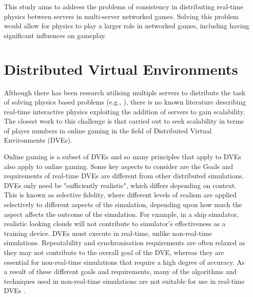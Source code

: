 This study aims to address the problems of consistency in distributing real-time physics between servers in multi-server networked games. Solving this problem would allow for physics to play a larger role in networked games, including having significant influences on gameplay.

\section{Distributed Virtual Environments} \label{distrubted_virtual_env}

Although there has been research utilising multiple servers to distribute the task of solving physics based problems (e.g., \cite{mashayekhi2018automatically}), there is no known literature describing real-time interactive physics exploiting the addition of servers to gain scalability. The closest work to this challenge is that carried out to seek scalability in terms of player numbers in online gaming in the field of Distributed Virtual Environments (DVEs). 

Online gaming is a subset of DVEs and so many principles that apply to DVEs also apply to online gaming. Some key aspects to consider are the Goals and requirements of real-time DVEs are different from other distributed simulations. DVEs only need be "sufficiently realistic", which differs depending on context. This is known as selective fidelity, where different levels of realism are applied selectively to different aspects of the simulation, depending upon how much the aspect affects the outcome of the simulation. For example, in a ship simulator, realistic looking clouds will not contribute to simulator's effectiveness as a training device. DVEs must execute in real-time, unlike non-real-time simulations. Repeatability and synchronisation requirements are often relaxed as they may not contribute to the overall goal of the DVE, whereas they are essential for non-real-time simulations that require a high degree of accuracy. As a result of these different goals and requirements, many of the algorithms and techniques used in non-real-time simulations are not suitable for use in real-time DVEs \cite{fujimoto2000parallel}.

